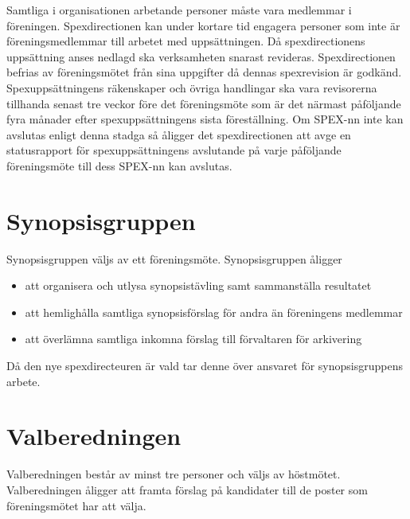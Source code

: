 \documentclass[a4paper]{article}
\begin{document}
\noindent
Samtliga i organisationen arbetande personer måste vara medlemmar i föreningen. Spexdirectionen kan under kortare tid engagera personer som inte är föreningsmedlemmar till arbetet med uppsättningen.\newline
\newline
Då spexdirectionens uppsättning anses nedlagd ska verksamheten snarast revideras. Spexdirectionen befrias av föreningsmötet från sina uppgifter då dennas spexrevision är godkänd.\newline
\newline
Spexuppsättningens räkenskaper och övriga handlingar ska vara revisorerna tillhanda senast tre veckor före det föreningsmöte som är det närmast påföljande fyra månader efter spexuppsättningens sista föreställning.\newline
\newline
Om SPEX-nn inte kan avslutas enligt denna stadga så åligger det spexdirectionen att avge en statusrapport för spexuppsättningens avslutande på varje påföljande föreningsmöte till dess SPEX-nn kan avslutas.

\section{Synopsisgruppen}
\label{section:synopsisgruppen}

Synopsisgruppen väljs av ett föreningsmöte.\newline
\newline
Synopsisgruppen åligger

\begin{itemize}
  \item att organisera och utlysa synopsistävling samt sammanställa resultatet
  \item att hemlighålla samtliga synopsisförslag för andra än föreningens medlemmar 
  \item att överlämna samtliga inkomna förslag till förvaltaren för arkivering
\end{itemize}

\noindent
Då den nye spexdirecteuren är vald tar denne över ansvaret för synopsisgruppens arbete.

\section{Valberedningen}
\label{section:valberedningen}

Valberedningen består av minst tre personer och väljs av höstmötet.\newline
\newline
Valberedningen åligger att framta förslag på kandidater till de poster som föreningsmötet har att välja.
\end{document}
